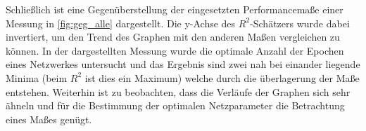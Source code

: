 Schließlich ist eine Gegenüberstellung der eingesetzten Performancemaße einer Messung in \autoref{fig:geg_alle} dargestellt. Die y-Achse des $R^2$-Schätzers wurde dabei invertiert, um den Trend des Graphen mit den anderen Maßen vergleichen zu können. In der dargestellten Messung wurde die optimale Anzahl der Epochen eines Netzwerkes untersucht und das Ergebnis sind zwei nah bei einander liegende Minima (beim $R^2$ ist dies ein Maximum) welche durch die überlagerung der Maße entstehen. Weiterhin ist zu beobachten, dass die Verläufe der Graphen sich sehr ähneln und für die Bestimmung der optimalen Netzparameter die Betrachtung eines Maßes genügt.